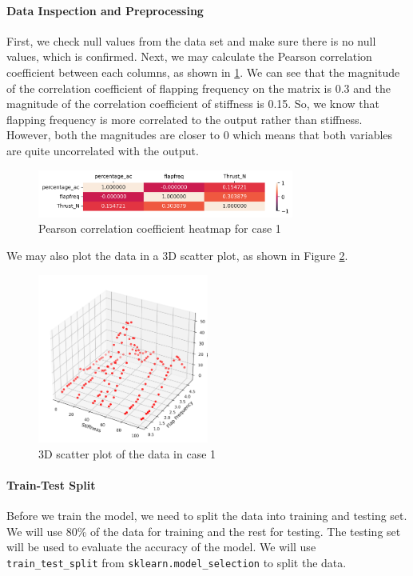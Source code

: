 \documentclass[conf]{new-aiaa}
\begin{document}
\paragraph{Data Inspection and Preprocessing}
First, we check null values from the data set and make sure there is no null values, which is confirmed. Next, we may calculate the Pearson correlation coefficient between each columns, as shown in \ref{fig:case1_corr_heatmap}. We can see that the magnitude of the correlation coefficient of flapping frequency on the matrix is 0.3 and the magnitude of the correlation coefficient of stiffness is 0.15. So, we know that flapping frequency is more correlated to the output rather than stiffness. However, both the magnitudes are closer to 0 which means that both variables are quite uncorrelated with the output.
\begin{figure}[H]
    \centering
    \includegraphics[width=0.75\textwidth]{graph/case1_corr_heatmap.png}
    \caption{\label{fig:case1_corr_heatmap} Pearson correlation coefficient heatmap for case 1}
\end{figure}
We may also plot the data in a 3D scatter plot, as shown in Figure \ref{fig:case1_3d_scatter}.
\begin{figure}[H]
    \centering
    \includegraphics[width=0.5\textwidth]{graph/case1_3d_scatter.png}
    \caption{\label{fig:case1_3d_scatter} 3D scatter plot of the data in case 1}
\end{figure}

\paragraph{Train-Test Split} Before we train the model, we need to split the data into training and testing set. We will use 80\% of the data for training and the rest for testing. The testing set will be used to evaluate the accuracy of the model. We will use \texttt{train\_test\_split} from \texttt{sklearn.model\_selection} to split the data. 
\end{document}
